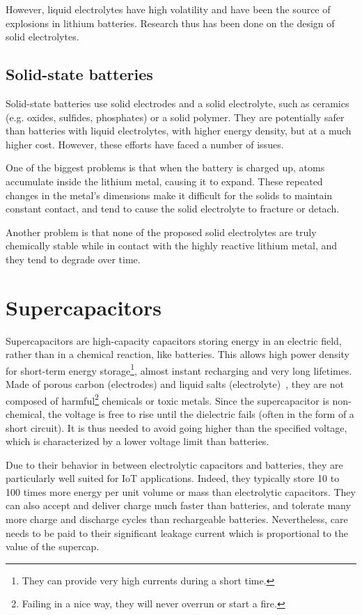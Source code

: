 \documentclass{EPL-master-thesis-covers-EN}
\begin{document}
However, liquid electrolytes have high volatility and have been the source of explosions in lithium batteries. Research thus has been done on the design of solid electrolytes.

\subsection*{Solid-state batteries}

Solid-state batteries use solid electrodes and a solid electrolyte, such as ceramics (e.g. oxides, sulfides, phosphates) or a solid polymer. They are potentially safer than batteries with liquid electrolytes, with higher energy density, but at a much higher cost.
However, these efforts have faced a number of issues.

One of the biggest problems is that when the battery is charged up, atoms accumulate inside the lithium metal, causing it to expand. These repeated changes in the metal’s dimensions make it difficult for the solids to maintain constant contact, and tend to cause the solid electrolyte to fracture or detach.

Another problem is that none of the proposed solid electrolytes are truly chemically stable while in contact with the highly reactive lithium metal, and they tend to degrade over time.

\section{Supercapacitors}

Supercapacitors are high-capacity capacitors storing energy in an electric field, rather than in a chemical reaction, like batteries. This allows high power density for short-term energy storage\footnote{They can provide very high currents during a short time.}, almost instant recharging and very long lifetimes. Made of porous carbon (electrodes) and liquid salts (electrolyte)~\cite{BAPTISTA20191153}, they are not composed of harmful\footnote{Failing in a nice way, they will never overrun or start a fire.} chemicals or toxic metals.
Since the supercapacitor is non-chemical, the voltage is free to rise until the dielectric fails (often in the form of a short circuit). It is thus needed to avoid going higher than the specified voltage, which is characterized by a lower voltage limit than batteries.

Due to their behavior in between electrolytic capacitors and batteries, they are particularly well suited for IoT applications. Indeed, they typically store 10 to 100 times more energy per unit volume or mass than electrolytic capacitors. They can also accept and deliver charge much faster than batteries, and tolerate many more charge and discharge cycles than rechargeable batteries. Nevertheless, care needs to be paid to their significant leakage current which is proportional to the value of the supercap.
\end{document}
